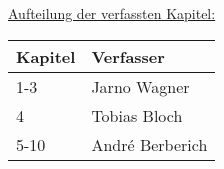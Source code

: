 \begin{center}
{\huge \underline{Aufteilung der verfassten Kapitel:}}\\
\end{center}

\begin{table}[H]
	\begin{center}
		\begin{tabular}{| m{6cm} | m{6cm} |} 
			\hline
			\textbf{Kapitel} & \textbf{Verfasser} \\ 
			\hline\hline
			1-3 & Jarno Wagner \\ 
			\hline 
			4 & Tobias Bloch \\ 
			\hline 
			5-10 & André Berberich \\ 
			\hline 
			\end{tabular}
	\end{center}
\end{table}

\newpage